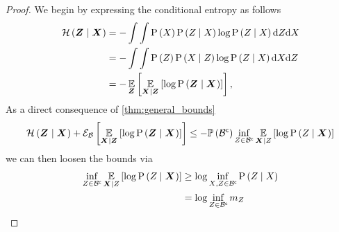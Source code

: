 \begin{proof}
	We begin by expressing the conditional entropy as follows
	\begin{align*}
		\mathcal{H}\left({\boldsymbol Z_{}}\mid{\ensuremath{\boldsymbol X_{}}}\right) & =-\int\int\mathrm{P}\left({X_{}}\right)\mathrm{P}\left({Z_{}{}}\mid{\ensuremath{X_{}}}\right)\log\mathrm{P}\left({Z_{}{}}\mid{\ensuremath{X_{}}}\right)\mathrm{d}Z_{}\mathrm{d}X_{}\\
		& =-\int\int\mathrm{P}\left({Z_{}}\right)\mathrm{P}\left({X_{}}\mid{\ensuremath{Z_{}}}\right)\log\mathrm{P}\left({Z_{}{}}\mid{\ensuremath{X_{}}}\right)\mathrm{d}X_{}\mathrm{d}Z_{}\\
		& =-\operatorname*{\mathbb{E}}\limits_{\boldsymbol Z_{}}\left[{\operatorname*{\mathbb{E}}\limits_{\boldsymbol X_{}\mid\boldsymbol Z_{}}\left[{\log \mathrm{P}\left({\boldsymbol Z_{}}\mid{\ensuremath{\boldsymbol X_{}}}\right)}\right]}\right],
		\label{eq:entropy_observation}
	\end{align*}
	As a direct consequence of \cref{thm:general_bounds}
	\begin{equation*}
		\mathcal{H}\left({\boldsymbol Z_{}}\mid{\ensuremath{\boldsymbol X_{}}}\right)+\mathcal{E}_{\mathcal B}\left[{\operatorname*{\mathbb{E}}\limits_{\boldsymbol X_{}\mid\boldsymbol Z_{}}\left[{\log\mathrm{P}\left({\boldsymbol Z_{}}\mid{\ensuremath{\boldsymbol X_{}}}\right)}\right]}\right]\leq
		-\mathbb{P}\left({{\mathcal B}^{\mathsf{c}}}\right)\inf_{Z_{}\in{\ensuremath{\mathcal B}}^{\mathsf{c}}}\operatorname*{\mathbb{E}}\limits_{\boldsymbol X_{}\mid Z_{}}\left[{\log\mathrm{P}\left({Z_{}}\mid{\ensuremath{\boldsymbol X_{}}}\right)}\right]
	\end{equation*}
	we can then loosen the bounds via
	\begin{align*}
		\inf_{Z_{}\in{\ensuremath{\mathcal B}}^{\mathsf{c}}}\operatorname*{\mathbb{E}}\limits_{\boldsymbol X_{}\mid Z_{}}\left[{\log\mathrm{P}\left({Z_{}}\mid{\ensuremath{\boldsymbol X_{}}}\right)}\right] & \geq \log\inf_{X_{},Z_{}\in{\ensuremath{\mathcal B}}^{\mathsf{c}}}\mathrm{P}\left({Z_{}}\mid{\ensuremath{X_{}}}\right) \\
		& =\log\inf_{Z_{}\in{\ensuremath{\mathcal B}}^{\mathsf{c}}}m_{Z_{}}
	\end{align*}
\end{proof}

